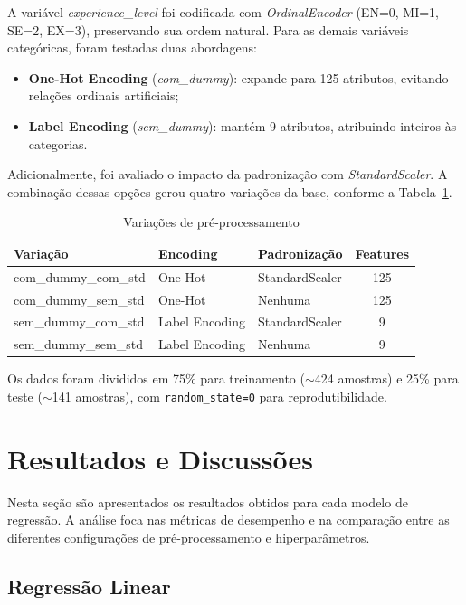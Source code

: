 \documentclass[12pt]{article}
\begin{document}
A variável \textit{experience\_level} foi codificada com \textit{OrdinalEncoder} (EN=0, MI=1, SE=2, EX=3), preservando sua ordem natural. Para as demais variáveis categóricas, foram testadas duas abordagens:

\begin{itemize}
    \item \textbf{One-Hot Encoding} (\textit{com\_dummy}): expande para 125 atributos, evitando relações ordinais artificiais;
    \item \textbf{Label Encoding} (\textit{sem\_dummy}): mantém 9 atributos, atribuindo inteiros às categorias.
\end{itemize}

Adicionalmente, foi avaliado o impacto da padronização com \textit{StandardScaler}. A combinação dessas opções gerou quatro variações da base, conforme a Tabela~\ref{tab:variacoes}.

\begin{table}[H]
\centering
\caption{Variações de pré-processamento}
\label{tab:variacoes}
\begin{tabular}{|l|l|l|c|}
\hline
\textbf{Variação} & \textbf{Encoding} & \textbf{Padronização} & \textbf{Features} \\ \hline
com\_dummy\_com\_std & One-Hot & StandardScaler & 125 \\ \hline
com\_dummy\_sem\_std & One-Hot & Nenhuma & 125 \\ \hline
sem\_dummy\_com\_std & Label Encoding & StandardScaler & 9 \\ \hline
sem\_dummy\_sem\_std & Label Encoding & Nenhuma & 9 \\ \hline
\end{tabular}
\end{table}

Os dados foram divididos em 75\% para treinamento ($\sim$424 amostras) e 25\% para teste ($\sim$141 amostras), com \texttt{random\_state=0} para reprodutibilidade.


\section{Resultados e Discussões}

Nesta seção são apresentados os resultados obtidos para cada modelo de regressão. A análise foca nas métricas de desempenho e na comparação entre as diferentes configurações de pré-processamento e hiperparâmetros.

\subsection{Regressão Linear}
\end{document}
